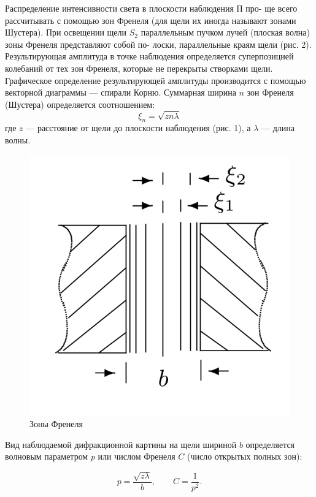 \documentclass[a4paper, 12pt]{article}
\begin{document}
Распределение интенсивности света в плоскости наблюдения П про-
ще всего рассчитывать с помощью зон Френеля (для щели их иногда
называют зонами Шустера). При освещении щели $ S_2 $ параллельным пучком лучей (плоская волна) зоны Френеля представляют собой по-
лоски, параллельные краям щели (рис. 2). Результирующая амплитуда
в точке наблюдения определяется суперпозицией колебаний от тех зон
Френеля, которые не перекрыты створками щели. Графическое определение результирующей амплитуды производится с помощью векторной
диаграммы --- спирали Корню. Суммарная ширина $ n $ зон Френеля (Шустера) определяется соотношением:
\begin{equation}\label{xin}
\xi_n = \sqrt{zn\lambda}
\end{equation}
где $ z $ --- расстояние от щели до плоскости наблюдения (рис. 1), а $ \lambda $ --- длина волны.

\begin{figure} 
	\includegraphics[width=\linewidth]{zone}
	\caption{Зоны Френеля}
	\label{zone}
\end{figure}

Вид наблюдаемой дифракционной картины
на щели шириной $ b $ определяется волновым параметром $ p $ или числом Френеля $ C $ (число открытых полных зон):


$$
p = \dfrac{\sqrt{z \lambda}}{b}, \qquad C = \dfrac{1}{p^2}.
$$
\end{document}
